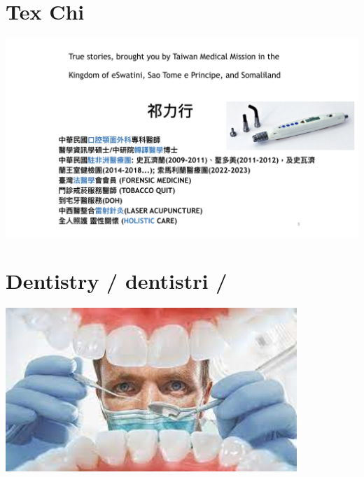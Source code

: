 \documentclass[
paper=landscape,
paper=160mm:90mm, %
fontsize=11pt, %
pagesize, %
parskip=half-, %
]{scrartcl} %
\theoremstyle{mythmstyle} %
\begin{document}




\section{Tex Chi}

\begin{center}
    

\includegraphics[width=0.85\linewidth]{ContemporaryOMS_Tex_CV.jpeg.001.jpeg}
\end{center}


\section{Dentistry / dentistri /}

\begin{center}
    

\includegraphics[width=11cm]{Dentistry.png}
\end{center}
\end{document}
